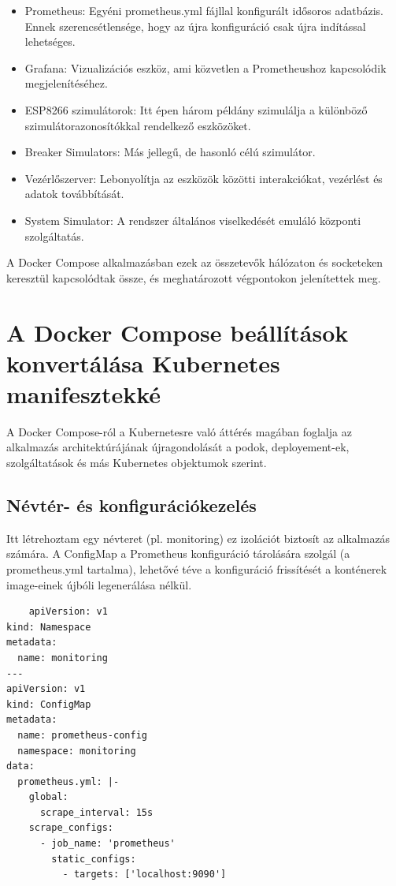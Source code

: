 \begin{itemize}
    \item Prometheus: Egyéni prometheus.yml fájllal konfigurált idősoros adatbázis. 
    Ennek szerencsétlensége, hogy az újra konfiguráció csak újra indítással lehetséges.
    
    \item Grafana: Vizualizációs eszköz, ami közvetlen a Prometheushoz kapcsolódik megjelenítéséhez.
    
    \item ESP8266 szimulátorok: Itt épen három példány szimulálja a különböző szimulátorazonosítókkal 
    rendelkező eszközöket.
    
    \item Breaker Simulators: Más jellegű, de hasonló célú szimulátor.
    
    \item Vezérlőszerver: Lebonyolítja az eszközök közötti interakciókat, vezérlést és adatok továbbítását.
    
    \item System Simulator: A rendszer általános viselkedését emuláló központi szolgáltatás.
\end{itemize}

A Docker Compose alkalmazásban ezek az összetevők hálózaton és socketeken keresztül kapcsolódtak össze, 
és meghatározott végpontokon jelenítettek meg. \cite{docker_kubernetes}

\section{A Docker Compose beállítások konvertálása Kubernetes manifesztekké}

A Docker Compose-ról a Kubernetesre való áttérés magában foglalja az alkalmazás architektúrájának 
újragondolását a podok, deployement-ek, szolgáltatások és más Kubernetes objektumok szerint. \cite{kubernetes}

\subsection{Névtér- és konfigurációkezelés}

Itt létrehoztam egy névteret (pl. monitoring) ez izolációt biztosít az alkalmazás számára. 
A ConfigMap a Prometheus konfiguráció tárolására szolgál (a prometheus.yml tartalma), 
lehetővé téve a konfiguráció frissítését a konténerek image-einek újbóli legenerálása nélkül.

\begin{lstlisting}
    apiVersion: v1
kind: Namespace
metadata:
  name: monitoring
---
apiVersion: v1
kind: ConfigMap
metadata:
  name: prometheus-config
  namespace: monitoring
data:
  prometheus.yml: |-
    global:
      scrape_interval: 15s
    scrape_configs:
      - job_name: 'prometheus'
        static_configs:
          - targets: ['localhost:9090']
\end{lstlisting}

